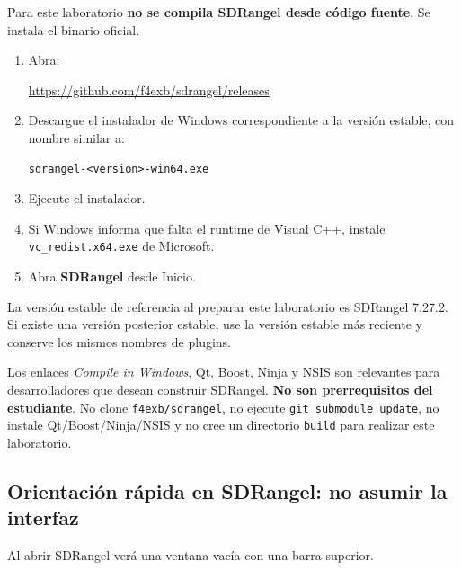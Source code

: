 Para este laboratorio \textbf{no se compila SDRangel desde código fuente}. Se instala el binario oficial.

\begin{enumerate}
    \item Abra:
    \begin{center}
    \url{https://github.com/f4exb/sdrangel/releases}
    \end{center}
    \item Descargue el instalador de Windows correspondiente a la versión estable, con nombre similar a:
    \begin{lstlisting}
sdrangel-<version>-win64.exe
    \end{lstlisting}
    \item Ejecute el instalador.
    \item Si Windows informa que falta el runtime de Visual C++, instale \texttt{vc\_redist.x64.exe} de Microsoft.
    \item Abra \textbf{SDRangel} desde Inicio.
\end{enumerate}

La versión estable de referencia al preparar este laboratorio es SDRangel 7.27.2. Si existe una versión posterior estable, use la versión estable más reciente y conserve los mismos nombres de plugins.

\begin{nota}
Los enlaces \emph{Compile in Windows}, Qt, Boost, Ninja y NSIS son relevantes para desarrolladores que desean construir SDRangel. \textbf{No son prerrequisitos del estudiante}. No clone \texttt{f4exb/sdrangel}, no ejecute \texttt{git submodule update}, no instale Qt/Boost/Ninja/NSIS y no cree un directorio \texttt{build} para realizar este laboratorio.
\end{nota}

\subsection{Orientación rápida en SDRangel: no asumir la interfaz}

Al abrir SDRangel verá una ventana vacía con una barra superior.

